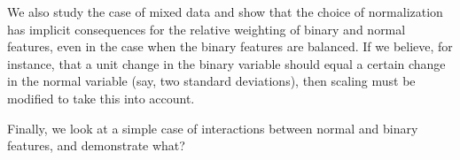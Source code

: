 We also study the case of mixed data and show that the choice of normalization has implicit
consequences for the relative weighting of binary and normal features, even in the case
when the binary features are balanced. If we believe, for instance, that a unit change in
the binary variable should equal a certain change in the normal variable (say, two standard
deviations), then scaling must be modified to take this into account.

Finally, we look at a simple case of interactions between normal and binary features, and
demonstrate what?

